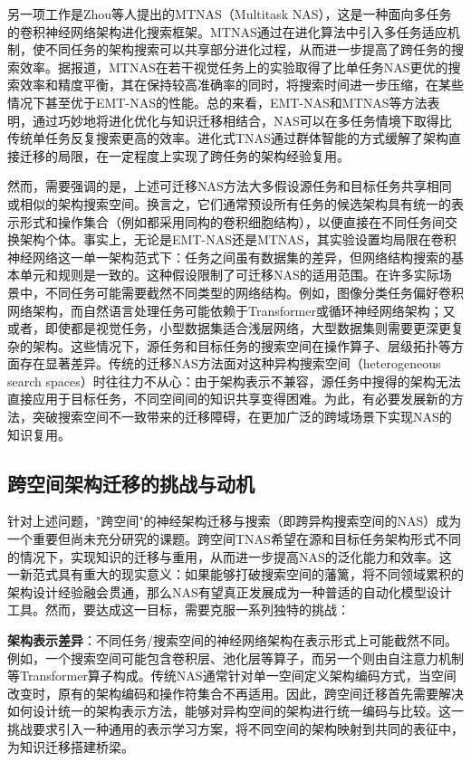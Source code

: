 \documentclass[../main.tex]{subfiles}
\begin{document}
另一项工作是Zhou等人提出的MTNAS（Multitask NAS），这是一种面向多任务的卷积神经网络架构进化搜索框架。MTNAS通过在进化算法中引入多任务适应机制，使不同任务的架构搜索可以共享部分进化过程，从而进一步提高了跨任务的搜索效率。据报道，MTNAS在若干视觉任务上的实验取得了比单任务NAS更优的搜索效率和精度平衡，其在保持较高准确率的同时，将搜索时间进一步压缩，在某些情况下甚至优于EMT-NAS的性能。总的来看，EMT-NAS和MTNAS等方法表明，通过巧妙地将进化优化与知识迁移相结合，NAS可以在多任务情境下取得比传统单任务反复搜索更高的效率。进化式TNAS通过群体智能的方式缓解了架构直接迁移的局限，在一定程度上实现了跨任务的架构经验复用。

然而，需要强调的是，上述可迁移NAS方法大多假设源任务和目标任务共享相同或相似的架构搜索空间。换言之，它们通常预设所有任务的候选架构具有统一的表示形式和操作集合（例如都采用同构的卷积细胞结构），以便直接在不同任务间交换架构个体。事实上，无论是EMT-NAS还是MTNAS，其实验设置均局限在卷积神经网络这一单一架构范式下：任务之间虽有数据集的差异，但网络结构搜索的基本单元和规则是一致的。这种假设限制了可迁移NAS的适用范围。在许多实际场景中，不同任务可能需要截然不同类型的网络结构。例如，图像分类任务偏好卷积网络架构，而自然语言处理任务可能依赖于Transformer或循环神经网络架构；又或者，即使都是视觉任务，小型数据集适合浅层网络，大型数据集则需要更深更复杂的架构。这些情况下，源任务和目标任务的搜索空间在操作算子、层级拓扑等方面存在显著差异。传统的迁移NAS方法面对这种异构搜索空间（heterogeneous search spaces）时往往力不从心：由于架构表示不兼容，源任务中搜得的架构无法直接应用于目标任务，不同空间间的知识共享变得困难。为此，有必要发展新的方法，突破搜索空间不一致带来的迁移障碍，在更加广泛的跨域场景下实现NAS的知识复用。

\subsection{跨空间架构迁移的挑战与动机}

针对上述问题，"跨空间"的神经架构迁移与搜索（即跨异构搜索空间的NAS）成为一个重要但尚未充分研究的课题。跨空间TNAS希望在源和目标任务架构形式不同的情况下，实现知识的迁移与重用，从而进一步提高NAS的泛化能力和效率。这一新范式具有重大的现实意义：如果能够打破搜索空间的藩篱，将不同领域累积的架构设计经验融会贯通，那么NAS有望真正发展成为一种普适的自动化模型设计工具。然而，要达成这一目标，需要克服一系列独特的挑战：

\textbf{架构表示差异}：不同任务/搜索空间的神经网络架构在表示形式上可能截然不同。例如，一个搜索空间可能包含卷积层、池化层等算子，而另一个则由自注意力机制等Transformer算子构成。传统NAS通常针对单一空间定义架构编码方式，当空间改变时，原有的架构编码和操作符集合不再适用。因此，跨空间迁移首先需要解决如何设计统一的架构表示方法，能够对异构空间的架构进行统一编码与比较。这一挑战要求引入一种通用的表示学习方案，将不同空间的架构映射到共同的表征中，为知识迁移搭建桥梁。
\end{document}

